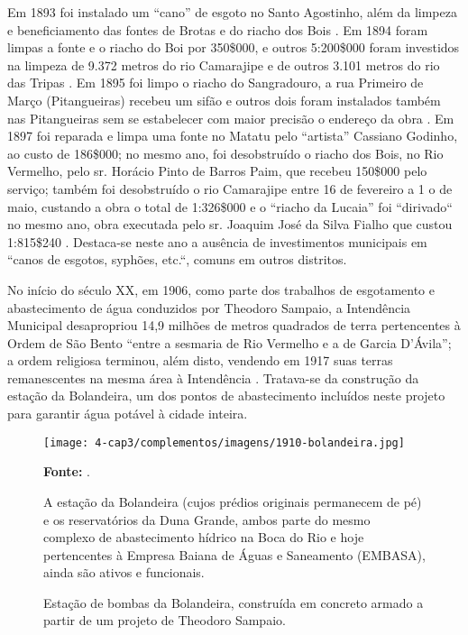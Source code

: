 Em 1893 foi instalado um “cano” de esgoto no Santo Agostinho, além da limpeza e beneficiamento das fontes de Brotas e do riacho dos Bois \cite[pp.~6-7]{salvador_relatorio_1893}. Em 1894 foram limpas a fonte e o riacho do Boi por 350\$000, e outros 5:200\$000 foram investidos na limpeza de 9.372 metros do rio Camarajipe e de outros 3.101 metros do rio das Tripas \cite[p.~156]{salvador_relatorio_1894}. Em 1895 foi limpo o riacho do Sangradouro, a rua Primeiro de Março (Pitangueiras) recebeu um sifão e outros dois foram instalados também nas Pitangueiras sem se estabelecer com maior precisão o endereço da obra \cite[pp.~20, 137-138]{salvador_relatorio_1895}. Em 1897 foi reparada e limpa uma fonte no Matatu pelo “artista” Cassiano Godinho, ao custo de 186\$000; no mesmo ano, foi desobstruído o riacho dos Bois, no Rio Vermelho, pelo sr. Horácio Pinto de Barros Paim, que recebeu 150\$000 pelo serviço; também foi desobstruído o rio Camarajipe entre 16 de fevereiro a 1 o de maio, custando a obra o total de 1:326\$000 e o “riacho da Lucaia” foi “dirivado“ no mesmo ano, obra executada pelo sr. Joaquim José da Silva Fialho que custou 1:815\$240 \cite[p.~99-100]{salvador_relatorio_1897}. Destaca-se neste ano a ausência de investimentos municipais em “canos de esgotos, syphões, etc.“, comuns em outros distritos.

No início do século XX, em 1906, como parte dos trabalhos de esgotamento e abastecimento de água conduzidos por Theodoro Sampaio, a Intendência Municipal desapropriou 14,9 milhões de metros quadrados de terra pertencentes à Ordem de São Bento ``entre a sesmaria de Rio Vermelho e a de Garcia D'Ávila''; a ordem religiosa terminou, além disto, vendendo em 1917 suas terras remanescentes na mesma área à Intendência \cite[p.~306]{VASCONCELOS2002}. Tratava-se da construção da estação da Bolandeira, um dos pontos de abastecimento incluídos neste projeto para garantir água potável à cidade inteira.

\begin{figure}[!htp]
\centering
\caption{Estação de bombas da Bolandeira, construída em concreto armado a partir de um projeto de Theodoro Sampaio.}
\texttt{[image: 4-cap3/complementos/imagens/1910-bolandeira.jpg]}{\par \footnotesize \textbf{Fonte:} . \par A estação da Bolandeira (cujos prédios originais permanecem de pé) e os reservatórios da Duna Grande, ambos parte do mesmo complexo de abastecimento hídrico na Boca do Rio e hoje pertencentes à Empresa Baiana de Águas e Saneamento (EMBASA), ainda são ativos e funcionais.}
\label{fig:bolandeira}
\end{figure}

